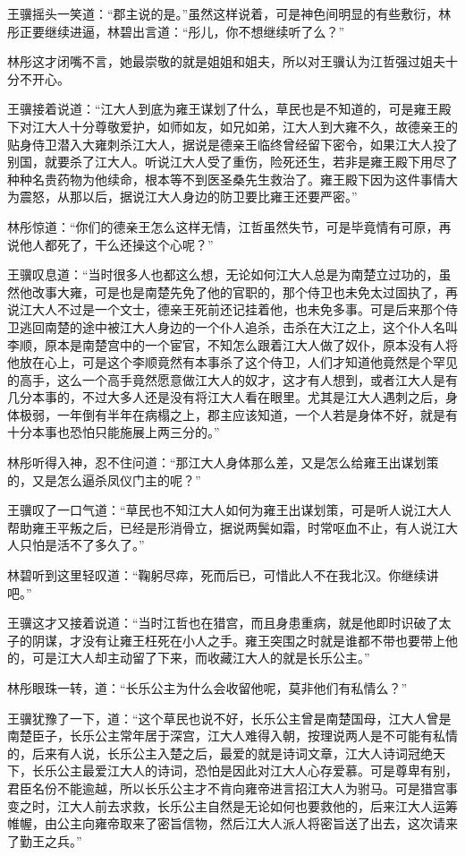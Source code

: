 王骥摇头一笑道：“郡主说的是。”虽然这样说着，可是神色间明显的有些敷衍，林彤正要继续进逼，林碧出言道：“彤儿，你不想继续听了么？”

林彤这才闭嘴不言，她最崇敬的就是姐姐和姐夫，所以对王骥认为江哲强过姐夫十分不开心。

王骥接着说道：“江大人到底为雍王谋划了什么，草民也是不知道的，可是雍王殿下对江大人十分尊敬爱护，如师如友，如兄如弟，江大人到大雍不久，故德亲王的贴身侍卫潜入大雍刺杀江大人，据说是德亲王临终曾经留下密令，如果江大人投了别国，就要杀了江大人。听说江大人受了重伤，险死还生，若非是雍王殿下用尽了种种名贵药物为他续命，根本等不到医圣桑先生救治了。雍王殿下因为这件事情大为震怒，从那以后，据说江大人身边的防卫要比雍王还要严密。”

林彤惊道：“你们的德亲王怎么这样无情，江哲虽然失节，可是毕竟情有可原，再说他人都死了，干么还操这个心呢？”

王骥叹息道：“当时很多人也都这么想，无论如何江大人总是为南楚立过功的，虽然他改事大雍，可是也是南楚先免了他的官职的，那个侍卫也未免太过固执了，再说江大人不过是一个文士，德亲王死前还记挂着他，也未免多事。可是后来那个侍卫逃回南楚的途中被江大人身边的一个仆人追杀，击杀在大江之上，这个仆人名叫李顺，原本是南楚宫中的一个宦官，不知怎么跟着江大人做了奴仆，原本没有人将他放在心上，可是这个李顺竟然有本事杀了这个侍卫，人们才知道他竟然是个罕见的高手，这么一个高手竟然愿意做江大人的奴才，这才有人想到，或者江大人是有几分本事的，不过大多人还是没有将江大人看在眼里。尤其是江大人遇刺之后，身体极弱，一年倒有半年在病榻之上，郡主应该知道，一个人若是身体不好，就是有十分本事也恐怕只能施展上两三分的。”

林彤听得入神，忍不住问道：“那江大人身体那么差，又是怎么给雍王出谋划策的，又是怎么逼杀凤仪门主的呢？”

王骥叹了一口气道：“草民也不知江大人如何为雍王出谋划策，可是听人说江大人帮助雍王平叛之后，已经是形消骨立，据说两鬓如霜，时常呕血不止，有人说江大人只怕是活不了多久了。”

林碧听到这里轻叹道：“鞠躬尽瘁，死而后已，可惜此人不在我北汉。你继续讲吧。”

王骥这才又接着说道：“当时江哲也在猎宫，而且身患重病，就是他即时识破了太子的阴谋，才没有让雍王枉死在小人之手。雍王突围之时就是谁都不带也要带上他的，可是江大人却主动留了下来，而收藏江大人的就是长乐公主。”

林彤眼珠一转，道：“长乐公主为什么会收留他呢，莫非他们有私情么？”

王骥犹豫了一下，道：“这个草民也说不好，长乐公主曾是南楚国母，江大人曾是南楚臣子，长乐公主常年居于深宫，江大人难得入朝，按理说两人是不可能有私情的，后来有人说，长乐公主入楚之后，最爱的就是诗词文章，江大人诗词冠绝天下，长乐公主最爱江大人的诗词，恐怕是因此对江大人心存爱慕。可是尊卑有别，君臣名份不能逾越，所以长乐公主才不肯向雍帝进言招江大人为驸马。可是猎宫事变之时，江大人前去求救，长乐公主自然是无论如何也要救他的，后来江大人运筹帷幄，由公主向雍帝取来了密旨信物，然后江大人派人将密旨送了出去，这次请来了勤王之兵。”

